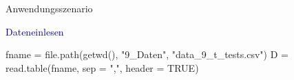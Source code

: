 \documentclass[
  8pt,
  ignorenonframetext,
]{beamer}
\newenvironment{Shaded}{\begin{snugshade}}{\end{snugshade}}
\newcommand{\AttributeTok}[1]{\textcolor[rgb]{0.77,0.63,0.00}{#1}}
\newcommand{\ConstantTok}[1]{\textcolor[rgb]{0.00,0.00,0.00}{#1}}
\newcommand{\FunctionTok}[1]{\textcolor[rgb]{0.00,0.00,0.00}{#1}}
\newcommand{\NormalTok}[1]{#1}
\newcommand{\OtherTok}[1]{\textcolor[rgb]{0.56,0.35,0.01}{#1}}
\newcommand{\StringTok}[1]{\textcolor[rgb]{0.31,0.60,0.02}{#1}}
\begin{document}
\begin{frame}[fragile]{Anwendungsszenario}
\protect\hypertarget{anwendungsszenario-2}{}
\vspace{3mm}
\small

\textcolor{darkblue}{Dateneinlesen}  \tiny \vspace{1mm}

\begin{Shaded}
\begin{Highlighting}[]
\NormalTok{fname       }\OtherTok{=} \FunctionTok{file.path}\NormalTok{(}\FunctionTok{getwd}\NormalTok{(), }\StringTok{"9\_Daten"}\NormalTok{, }\StringTok{"data\_9\_t\_tests.csv"}\NormalTok{)}
\NormalTok{D           }\OtherTok{=} \FunctionTok{read.table}\NormalTok{(fname, }\AttributeTok{sep =} \StringTok{","}\NormalTok{, }\AttributeTok{header =} \ConstantTok{TRUE}\NormalTok{)}
\end{Highlighting}
\end{Shaded}

\vspace{-1mm}


\end{frame}
\end{document}
